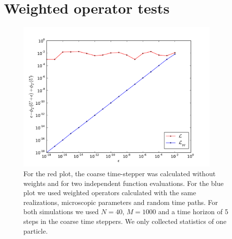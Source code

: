 \documentclass[]{article}
\title{}
\author{}
\begin{document}
\maketitle

\begin{abstract}
\end{abstract}


\section{Weighted operator tests}
\begin{figure}
\includegraphics[width=0.9\textwidth]{epsilon_dependence_M1000_N40_1dim.pdf}
\caption{For the red plot, the coarse time-stepper was calculated without weights and for two independent function evaluations. For the blue plot we used weighted operators calculated with the same realizations, microscopic parameters and random time paths. For both simulations we used $N=40$, $M=1000$ and a time horizon of 5 steps in the coarse time steppers. We only collected statistics of one particle.}
\label{fig:epsilon}
\end{figure}
\end{document}
